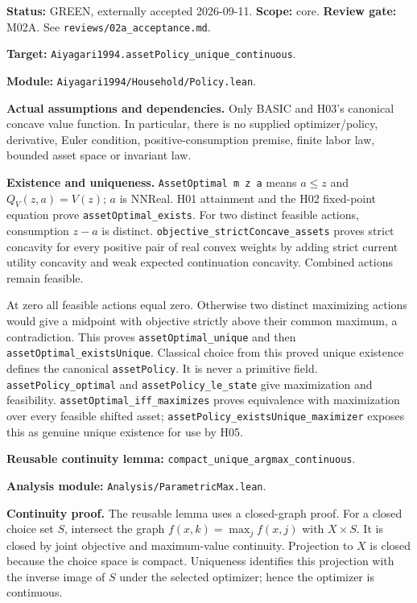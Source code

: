 \documentclass[
  11pt,
]{article}
\let\LedgerOriginalTexttt\texttt
\renewcommand{\texttt}[1]{{\small\LedgerOriginalTexttt{#1}}}
\begin{document}
\textbf{Status:} GREEN, externally accepted 2026-09-11. \textbf{Scope:}
core. \textbf{Review gate:} M02A. See
\texttt{reviews/02a\_acceptance.md}.

\textbf{Target:} \texttt{Aiyagari1994.assetPolicy\_unique\_continuous}.

\textbf{Module:} \texttt{Aiyagari1994/Household/Policy.lean}.

\textbf{Actual assumptions and dependencies.} Only BASIC and H03's
canonical concave value function. In particular, there is no supplied
optimizer/policy, derivative, Euler condition, positive-consumption
premise, finite labor law, bounded asset space or invariant law.

\textbf{Existence and uniqueness.} \texttt{AssetOptimal\ m\ z\ a} means
\(a\leq z\) and \(Q_V(z,a)=V(z)\); \(a\) is NNReal. H01 attainment and
the H02 fixed-point equation prove \texttt{assetOptimal\_exists}. For
two distinct feasible actions, consumption \(z-a\) is distinct.
\texttt{objective\_strictConcave\_assets} proves strict concavity for
every positive pair of real convex weights by adding strict current
utility concavity and weak expected continuation concavity. Combined
actions remain feasible.

At zero all feasible actions equal zero. Otherwise two distinct
maximizing actions would give a midpoint with objective strictly above
their common maximum, a contradiction. This proves
\texttt{assetOptimal\_unique} and then
\texttt{assetOptimal\_existsUnique}. Classical choice from this proved
unique existence defines the canonical \texttt{assetPolicy}. It is never
a primitive field. \texttt{assetPolicy\_optimal} and
\texttt{assetPolicy\_le\_state} give maximization and feasibility.
\texttt{assetOptimal\_iff\_maximizes} proves equivalence with
maximization over every feasible shifted asset;
\texttt{assetPolicy\_existsUnique\_maximizer} exposes this as genuine
unique existence for use by H05.

\textbf{Reusable continuity lemma:}
\texttt{compact\_unique\_argmax\_continuous}.

\textbf{Analysis module:} \texttt{Analysis/ParametricMax.lean}.

\textbf{Continuity proof.} The reusable lemma uses a closed-graph proof.
For a closed choice set \(S\), intersect the graph
\(f(x,k)=\max_j f(x,j)\) with \(X\times S\). It is closed by joint
objective and maximum-value continuity. Projection to \(X\) is closed
because the choice space is compact. Uniqueness identifies this
projection with the inverse image of \(S\) under the selected optimizer;
hence the optimizer is continuous.
\end{document}
